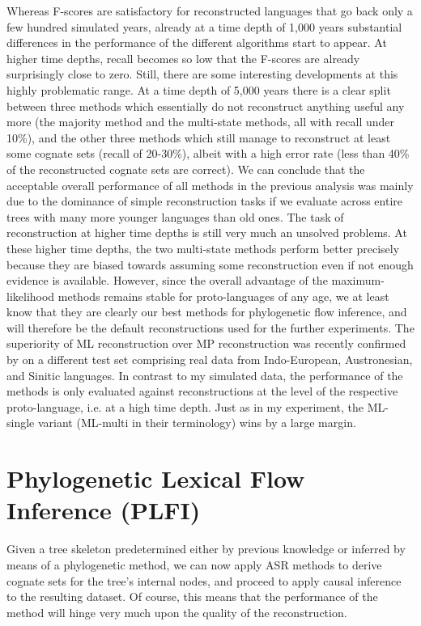Whereas F-scores are satisfactory for reconstructed languages that go back only a few hundred simulated years, already at a time depth of 1,000 years substantial differences in the performance of the different algorithms start to appear. At higher time depths, recall becomes so low that the F-scores are already surprisingly close to zero. Still, there are some interesting developments at this highly problematic range. At a time depth of 5,000 years there is a clear split between three methods which essentially do not reconstruct anything useful any more (the majority method and the multi-state methods, all with recall under 10\%), and the other three methods which still manage to reconstruct at least some cognate sets (recall of 20-30\%), albeit with a high error rate (less than 40\% of the reconstructed cognate sets are correct). We can conclude that the acceptable overall performance of all methods in the previous analysis was mainly due to the dominance of simple reconstruction tasks if we evaluate across 
entire trees with many more younger languages than old ones. The task of reconstruction at higher time depths is still very much an unsolved problems. At these higher time depths, the two multi-state methods perform better precisely because they are biased towards assuming some reconstruction even if not enough evidence is available. However, since the overall advantage of the maximum-likelihood methods remains stable for proto-lan\-guages of any age, we at least know that they are clearly our best methods for phylogenetic flow inference, and will therefore be the default reconstructions used for the further experiments. The superiority of ML reconstruction over MP reconstruction was recently confirmed by \cite{jaeger_list_2017} on a different test set comprising real data from Indo-European, Austronesian, and Sinitic languages. In contrast to my simulated data, the performance of the methods is only evaluated against reconstructions at the level of the respective proto-language, i.e. at a high time depth. Just 
as in my experiment, the ML-single variant (ML-multi in their terminology) wins by a large margin.

\largerpage
\section{Phylogenetic Lexical Flow Inference (PLFI)}\label{sec:6.8}
Given a tree skeleton predetermined either by previous knowledge or inferred by means of a phylogenetic method, we can now apply ASR methods to derive cognate sets for the tree's internal nodes, and proceed to apply causal inference to the resulting dataset. Of course, this means that the performance of the method will hinge very much upon the quality of the reconstruction.

